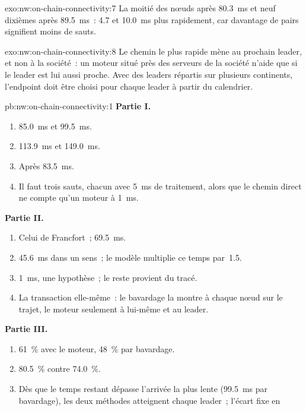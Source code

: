 \begin{solution}{exo:nw:on-chain-connectivity:7}
La moitié des nœuds après \qty{80.3}{\milli\second} et neuf dixièmes après \qty{89.5}{\milli\second}~: 4.7 et \qty{10.0}{\milli\second} plus rapidement, car davantage
de pairs signifient moins de sauts.
\end{solution}

\begin{solution}{exo:nw:on-chain-connectivity:8}
Le chemin le plus rapide mène au prochain leader, et non à la société~: un moteur situé près des serveurs de la société n'aide que si le leader est lui aussi proche. Avec des leaders
répartis sur plusieurs continents, l'endpoint doit être choisi pour chaque leader à partir du calendrier.
\end{solution}

\begin{solution}{pb:nw:on-chain-connectivity:1}
\textbf{Partie I.}
\begin{enumerate}
\item \qty{85.0}{\milli\second} et \qty{99.5}{\milli\second}.
\item \qty{113.9}{\milli\second} et \qty{149.0}{\milli\second}.
\item Après \qty{83.5}{\milli\second}.
\item Il faut trois sauts, chacun avec \qty{5}{\milli\second} de traitement, alors que le chemin direct ne compte qu'un moteur à \qty{1}{\milli\second}.
\end{enumerate}
\textbf{Partie II.}
\begin{enumerate}[resume]
\item Celui de Francfort~; \qty{69.5}{\milli\second}.
\item \qty{45.6}{\milli\second} dans un sens~; le modèle multiplie ce temps par~1.5.
\item \qty{1}{\milli\second}, une hypothèse~; le reste provient du tracé.
\item La transaction elle-même~: le bavardage la montre à chaque nœud sur le trajet, le moteur seulement à lui-même et au leader.
\end{enumerate}
\textbf{Partie III.}
\begin{enumerate}[resume]
\item 61~\% avec le moteur, 48~\% par bavardage.
\item 80.5~\% contre 74.0~\%.
\item Dès que le temps restant dépasse l'arrivée la plus lente (\qty{99.5}{\milli\second} par bavardage), les deux méthodes atteignent chaque leader~; l'écart fixe en

\end{enumerate}
\end{solution}
